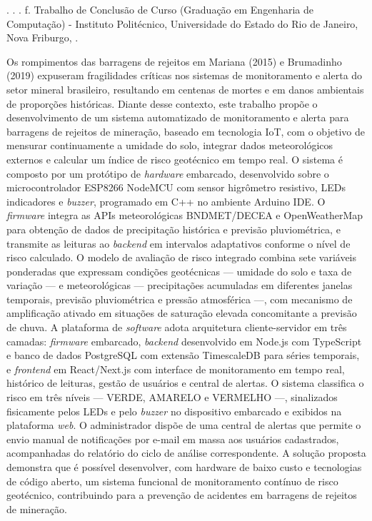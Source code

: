 \begin{resumo}
\begin{SingleSpace}

\noindent
\begin{flushleft}
\entradaAutor{}. \textit{\imprimirtitulo}. \the\year. \pageref{LastPage} f. Trabalho de Conclusão de Curso (Graduação em Engenharia de Computação) - Instituto Politécnico, Universidade do Estado do Rio de Janeiro, Nova Friburgo, \the\year.
\end{flushleft}
\vspace{\onelineskip}

\setlength{\parindent}{1.3cm}

Os rompimentos das barragens de rejeitos em Mariana (2015) e Brumadinho
(2019) expuseram fragilidades críticas nos sistemas de monitoramento e
alerta do setor mineral brasileiro, resultando em centenas de mortes e
em danos ambientais de proporções históricas. Diante desse contexto,
este trabalho propõe o desenvolvimento de um sistema automatizado de
monitoramento e alerta para barragens de rejeitos de mineração, baseado
em tecnologia IoT, com o objetivo de mensurar continuamente a umidade do
solo, integrar dados meteorológicos externos e calcular um índice de
risco geotécnico em tempo real. O sistema é composto por um protótipo de
\textit{hardware} embarcado, desenvolvido sobre o microcontrolador
ESP8266 NodeMCU com sensor higrômetro resistivo, LEDs indicadores e
\textit{buzzer}, programado em C++ no ambiente Arduino IDE. O
\textit{firmware} integra as APIs meteorológicas BNDMET/DECEA e
OpenWeatherMap para obtenção de dados de precipitação histórica e
previsão pluviométrica, e transmite as leituras ao \textit{backend} em
intervalos adaptativos conforme o nível de risco calculado. O modelo de
avaliação de risco integrado combina sete variáveis ponderadas que
expressam condições geotécnicas --- umidade do solo e taxa de variação
--- e meteorológicas --- precipitações acumuladas em diferentes janelas
temporais, previsão pluviométrica e pressão atmosférica ---, com
mecanismo de amplificação ativado em situações de saturação elevada
concomitante a previsão de chuva. A plataforma de \textit{software}
adota arquitetura cliente-servidor em três camadas: \textit{firmware}
embarcado, \textit{backend} desenvolvido em Node.js com TypeScript e
banco de dados PostgreSQL com extensão TimescaleDB para séries temporais,
e \textit{frontend} em React/Next.js com interface de monitoramento em
tempo real, histórico de leituras, gestão de usuários e central de
alertas. O sistema classifica o risco em três níveis --- VERDE, AMARELO
e VERMELHO ---, sinalizados fisicamente pelos LEDs e pelo \textit{buzzer}
no dispositivo embarcado e exibidos na plataforma \textit{web}. O
administrador dispõe de uma central de alertas que permite o envio manual
de notificações por e-mail em massa aos usuários cadastrados, acompanhadas
do relatório do ciclo de análise correspondente. A solução proposta
demonstra que é possível desenvolver, com hardware de baixo custo e
tecnologias de código aberto, um sistema funcional de monitoramento
contínuo de risco geotécnico, contribuindo para a prevenção de acidentes
em barragens de rejeitos de mineração.


\end{SingleSpace}
\end{resumo}
